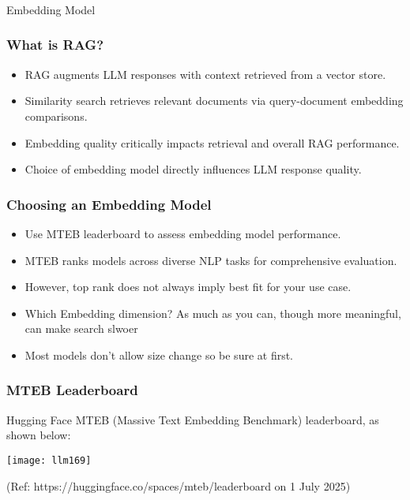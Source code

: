\begin{frame}[fragile]\frametitle{}
\begin{center}
{\Large Embedding Model}

\end{center}
\end{frame}

\begin{frame}[fragile]\frametitle{What is RAG?}
    \begin{itemize}
        \item RAG augments LLM responses with context retrieved from a vector store.
        \item Similarity search retrieves relevant documents via query-document embedding comparisons.
        \item Embedding quality critically impacts retrieval and overall RAG performance.
        \item Choice of embedding model directly influences LLM response quality.
    \end{itemize}
\end{frame}

\begin{frame}[fragile]\frametitle{Choosing an Embedding Model}
    \begin{itemize}
        \item Use MTEB leaderboard to assess embedding model performance.
        \item MTEB ranks models across diverse NLP tasks for comprehensive evaluation.
        \item However, top rank does not always imply best fit for your use case.
		\item Which Embedding dimension? As much as you can, though more meaningful, can make search slwoer
		\item Most models don't allow size change so be sure at first.
    \end{itemize}
\end{frame}

\begin{frame}[fragile]\frametitle{MTEB Leaderboard}
Hugging Face MTEB (Massive Text Embedding Benchmark) leaderboard, as shown below:

		\begin{center}
		\texttt{[image: llm169]}
		
		{\tiny (Ref: https://huggingface.co/spaces/mteb/leaderboard on 1 July 2025)}
		
		\end{center}


\end{frame}


